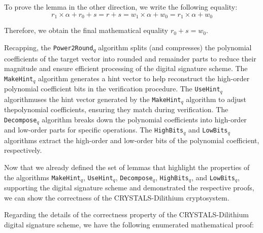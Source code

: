 \documentclass[runningheads]{llncs}
\numberwithin{equation}{section}
\begin{document}
    \noindent To prove the lemma in the other direction, we write the following equality:
    $$ {r}_{1} \times \alpha + {r}_{0} + s = r + s = {w}_{1} \times \alpha + {w}_{0} = {r}_{1} \times \alpha + {w}_{0} $$

    \noindent Therefore, we obtain the final mathematical equality ${r}_{0} + s = {w}_{0}$.

    \vspace{4ex}

    \noindent Recapping, the \texttt{Power2Round}\textsubscript{$q$} algorithm splits (and compresses) the polynomial coefficients of the target vector into rounded and remainder parts to reduce their magnitude and ensure efficient processing of the digital signature scheme. The \texttt{MakeHint}${}_{q}$ algorithm generates a hint vector to help reconstruct the high-order polynomial coefficient bits in the verification procedure. The \texttt{UseHint}${}_{q}$ algorithm\break uses the hint vector generated by the \texttt{MakeHint}${}_{q}$ algorithm to adjust the\break polynomial coefficients, ensuring they match during verification. The \texttt{Decompose}${}_{q}$ algorithm breaks down the polynomial coefficients into high-order and low-order parts for specific operations. The \texttt{HighBits}${}_{q}$ and \texttt{LowBits}${}_{q}$ algorithms extract the high-order and low-order bits of the polynomial coefficient, respectively.

    \vspace{2ex}

    \noindent Now that we already defined the set of lemmas that highlight the properties of the algorithms \texttt{MakeHint}${}_{q}$, \texttt{UseHint}${}_{q}$, \texttt{Decompose}${}_{q}$, \texttt{HighBits}${}_{q}$, and \texttt{LowBits}${}_{q}$, supporting the digital signature scheme and demonstrated the respective proofs, we can show the correctness of the CRYSTALS-Dilithium cryptosystem.
    
    \clearpage
    
    \noindent Regarding the details of the correctness property of the CRYSTALS-Dilithium digital signature scheme, we have the following enumerated mathematical proof:
\end{document}
